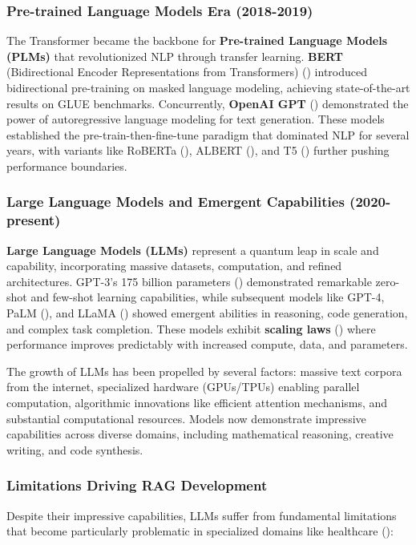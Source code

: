 \subsubsection{Pre-trained Language Models Era (2018-2019)}
The Transformer became the backbone for \textbf{Pre-trained Language Models (PLMs)} that revolutionized NLP through transfer learning. \textbf{BERT} (Bidirectional Encoder Representations from Transformers) (\citep{devlin2019bert}) introduced bidirectional pre-training on masked language modeling, achieving state-of-the-art results on GLUE benchmarks. Concurrently, \textbf{OpenAI GPT} (\citep{radford2019language}) demonstrated the power of autoregressive language modeling for text generation. These models established the pre-train-then-fine-tune paradigm that dominated NLP for several years, with variants like RoBERTa (\citep{liu2019roberta}), ALBERT (\citep{lan2020albert}), and T5 (\citep{raffel2020t5}) further pushing performance boundaries.

\subsubsection{Large Language Models and Emergent Capabilities (2020-present)}
\textbf{Large Language Models (LLMs)} represent a quantum leap in scale and capability, incorporating massive datasets, computation, and refined architectures. GPT-3's 175 billion parameters (\citep{brown2020language}) demonstrated remarkable zero-shot and few-shot learning capabilities, while subsequent models like GPT-4, PaLM (\citep{chowdhery2022palm}), and LLaMA (\citep{touvron2023llama}) showed emergent abilities in reasoning, code generation, and complex task completion. These models exhibit \textbf{scaling laws} (\citep{kaplan2020scaling}) where performance improves predictably with increased compute, data, and parameters.

The growth of LLMs has been propelled by several factors: massive text corpora from the internet, specialized hardware (GPUs/TPUs) enabling parallel computation, algorithmic innovations like efficient attention mechanisms, and substantial computational resources. Models now demonstrate impressive capabilities across diverse domains, including mathematical reasoning, creative writing, and code synthesis.

\subsubsection{Limitations Driving RAG Development}
Despite their impressive capabilities, LLMs suffer from fundamental limitations that become particularly problematic in specialized domains like healthcare (\citep{ji2023survey}):

